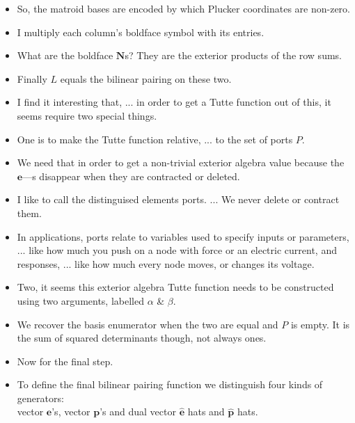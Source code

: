 \documentclass[14pt]{extarticle}
\begin{document}
{\begin{itemize}
\item
So, the matroid bases are encoded by which Plucker coordinates are non-zero.

\item
I multiply each column's boldface symbol with its entries.

\item
  What are the boldface $\mathbf{N}$s?
  They are the exterior products of the row sums.

\item
  Finally $L$ equals the bilinear pairing on these two.

\item
  I find it interesting that, ... in order to get a Tutte function out
  of this, it seems require two special things.

\item
One is to make the Tutte function relative, ... to the set of ports $P$.

\item
  We need that in order to get a non-trivial exterior algebra
  value because the $\mathbf{e}$---s  disappear when they are contracted or deleted.

\item
  I like to call the distinguised elements ports. ... We never delete or contract them.


\item In applications, ports relate to variables used to specify inputs
  or parameters, ... like how much you push on a node with force or an electric current,
  and responses, ... like how much every node moves, or changes its voltage.

\item
  Two, it seems this exterior algebra Tutte function needs to be constructed using
  two arguments, labelled $\alpha$ \& $\beta$.

\item
  We recover the basis enumerator when the two are equal and $P$ is empty.  It
  is the sum of squared determinants though, not always ones.

\item Now for the final step.

\item
  To define the final bilinear pairing function 
  we distinguish 
  four kinds of generators:\\
  vector $\mathbf{e}$'s, vector $\mathbf{p}$'s and
dual vector $\widehat{\mathbf{e}}$ hats and $\widehat{\mathbf{p}}$ hats.  


\end{itemize}}
\end{document}
